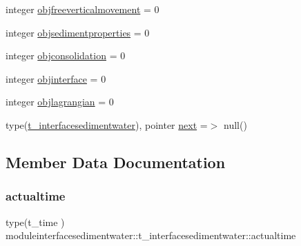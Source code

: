 \begin{DoxyCompactItemize}
\item 
integer \mbox{\hyperlink{structmoduleinterfacesedimentwater_1_1t__interfacesedimentwater_a3defd6a9ad291baef9bfaa6beed434d7}{objfreeverticalmovement}} = 0
\item 
integer \mbox{\hyperlink{structmoduleinterfacesedimentwater_1_1t__interfacesedimentwater_a0f98f3e84959626e1f808c2dbc21e5e7}{objsedimentproperties}} = 0
\item 
integer \mbox{\hyperlink{structmoduleinterfacesedimentwater_1_1t__interfacesedimentwater_ac995beb6768ffd19f35b0a23b7029fbd}{objconsolidation}} = 0
\item 
integer \mbox{\hyperlink{structmoduleinterfacesedimentwater_1_1t__interfacesedimentwater_a07687aa8c3aa0ae521f89bbf378c7722}{objinterface}} = 0
\item 
integer \mbox{\hyperlink{structmoduleinterfacesedimentwater_1_1t__interfacesedimentwater_a23ee0cffc761c1c7498b89d932404e13}{objlagrangian}} = 0
\item 
type(\mbox{\hyperlink{structmoduleinterfacesedimentwater_1_1t__interfacesedimentwater}{t\+\_\+interfacesedimentwater}}), pointer \mbox{\hyperlink{structmoduleinterfacesedimentwater_1_1t__interfacesedimentwater_a9388d7944757e16865989dfd1a72ac1d}{next}} =$>$ null()
\end{DoxyCompactItemize}


\subsection{Member Data Documentation}
\mbox{\label{structmoduleinterfacesedimentwater_1_1t__interfacesedimentwater_aa925e4f54957b079568a8cae772a5fd6}} 
\subsubsection{\texorpdfstring{actualtime}{actualtime}}
{\footnotesize\ttfamily type(t\+\_\+time ) moduleinterfacesedimentwater\+::t\+\_\+interfacesedimentwater\+::actualtime\hspace{0.3cm}{\ttfamily [private]}}

\mbox{\label{structmoduleinterfacesedimentwater_1_1t__interfacesedimentwater_a220d4d6640a3e24d407aa721594ca80d}} 
